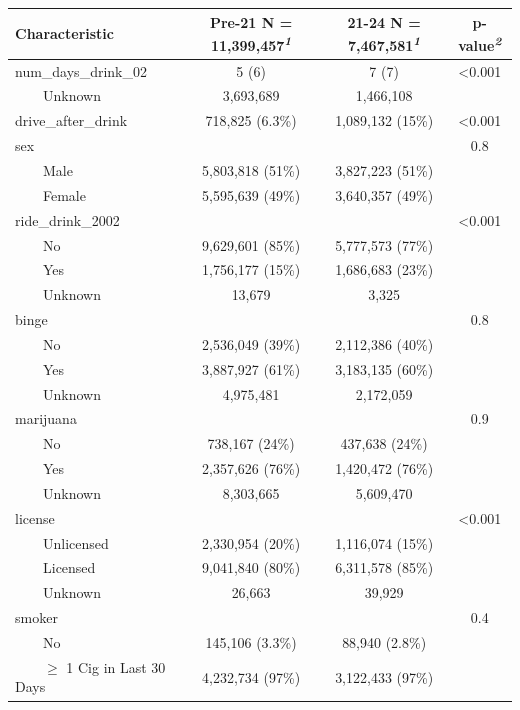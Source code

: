 \documentclass[
]{article}
\begin{document}
\begin{table}[t]
\fontsize{12.0pt}{14.0pt}\selectfont
\begin{tabular*}{\linewidth}{@{\extracolsep{\fill}}lccc}
\toprule
\textbf{Characteristic} & \textbf{Pre-21}  N = 11,399,457\textsuperscript{\textit{1}} & \textbf{21-24}  N = 7,467,581\textsuperscript{\textit{1}} & \textbf{p-value}\textsuperscript{\textit{2}} \\ 
\midrule\addlinespace[2.5pt]
num\_days\_drink\_02 & 5 (6) & 7 (7) & <0.001 \\ 
    Unknown & 3,693,689 & 1,466,108 &  \\ 
drive\_after\_drink & 718,825 (6.3\%) & 1,089,132 (15\%) & <0.001 \\ 
sex &  &  & 0.8 \\ 
    Male & 5,803,818 (51\%) & 3,827,223 (51\%) &  \\ 
    Female & 5,595,639 (49\%) & 3,640,357 (49\%) &  \\ 
ride\_drink\_2002 &  &  & <0.001 \\ 
    No & 9,629,601 (85\%) & 5,777,573 (77\%) &  \\ 
    Yes & 1,756,177 (15\%) & 1,686,683 (23\%) &  \\ 
    Unknown & 13,679 & 3,325 &  \\ 
binge &  &  & 0.8 \\ 
    No & 2,536,049 (39\%) & 2,112,386 (40\%) &  \\ 
    Yes & 3,887,927 (61\%) & 3,183,135 (60\%) &  \\ 
    Unknown & 4,975,481 & 2,172,059 &  \\ 
marijuana &  &  & 0.9 \\ 
    No & 738,167 (24\%) & 437,638 (24\%) &  \\ 
    Yes & 2,357,626 (76\%) & 1,420,472 (76\%) &  \\ 
    Unknown & 8,303,665 & 5,609,470 &  \\ 
license &  &  & <0.001 \\ 
    Unlicensed & 2,330,954 (20\%) & 1,116,074 (15\%) &  \\ 
    Licensed & 9,041,840 (80\%) & 6,311,578 (85\%) &  \\ 
    Unknown & 26,663 & 39,929 &  \\ 
smoker &  &  & 0.4 \\ 
    No & 145,106 (3.3\%) & 88,940 (2.8\%) &  \\ 
    \ensuremath{\geq} 1 Cig in Last 30 Days & 4,232,734 (97\%) & 3,122,433 (97\%) &  \\ 

\end{tabular*}
\end{table}
\end{document}
